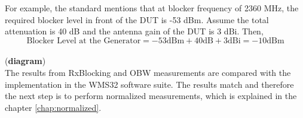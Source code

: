 For example, the standard mentions that at blocker frequency of 2360 MHz, the required blocker level in front of the DUT is -53 dBm. Assume the total attenuation is 40 dB and the antenna gain of the DUT is 3 dBi. Then,
$$\mbox{Blocker Level at the Generator} = -53 \mbox{dBm} + 40 \mbox{dB}+ 3 \mbox{dBi} = -10 \mbox{dBm}$$ \\

(\textbf{diagram})\\

The results from \acf{RxBlocking} and \acf{OBW} measurements are compared with the implementation in the WMS32 software suite. The results match and therefore the next step is to perform normalized measurements, which is explained in the chapter \ref{chap:normalized}.






